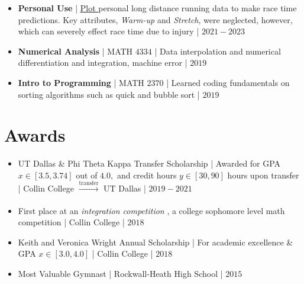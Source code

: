 \documentclass{article}
\begin{document}
\begin{itemize}
    \item \textbf{Personal Use} | \href{https://github.com/lukebr100/visualiztions}{Plot } personal long distance running data to make race time predictions. Key attributes, \textit{Warm-up} and \textit{Stretch}, were neglected, however, which can severely effect race time due to injury | $2021-2023$

    \item \textbf{Numerical Analysis} | MATH $4334$ | Data interpolation and numerical differentiation and integration, machine error | $2019$
        
    \item \textbf{Intro to Programming} | MATH $2370$ | Learned coding fundamentals on sorting algorithms such as quick and bubble sort | $2019$ \medskip
\end{itemize}

\section{Awards}
\begin{itemize}
\item UT Dallas \& Phi Theta Kappa Transfer Scholarship | Awarded for GPA $x \in [3.5, 3.74]$ out of $4.0 ,$ and credit hours $y \in [30, 90]$ hours upon transfer | Collin College $\xrightarrow[]{\text{transfer}}$ UT Dallas | $2019 - 2021$
\item First place at an \textit{integration competition }, a college sophomore level math competition | Collin College | $2018$
\item Keith and Veronica Wright Annual Scholarship | For academic excellence \& GPA $x \in [3.0, 4.0]$ | Collin College | $2018$
\item Most Valuable Gymnast | Rockwall-Heath High School | $2015$ \medskip
\end{itemize}
\end{document}
